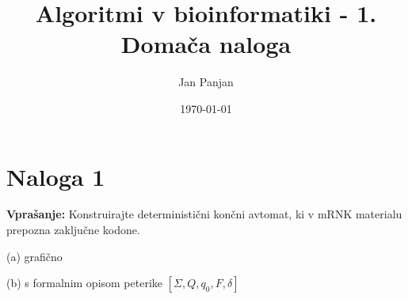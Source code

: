\documentclass{article}
\title{Algoritmi v bioinformatiki - 1. Domača naloga}
\author{Jan Panjan}
\date{\today}
\begin{document}
\maketitle

\section*{Naloga 1} %
\textbf{Vprašanje:}
Konstruirajte deterministični končni avtomat, ki v mRNK materialu prepozna zaključne kodone.

(a) grafično

(b) s formalnim opisom peterike $ \left[ \Sigma, Q, q_0, F, \delta \right] $
\end{document}
